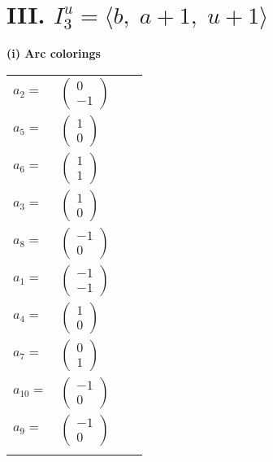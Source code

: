 \documentclass[1p]{elsarticle_modified}
\theoremstyle{definition}
\begin{document}
\centering \section*{III. $I^u_{3}= \langle b,\;a+1,\;u+1 \rangle$}
\flushleft \textbf{(i) Arc colorings}\\
\begin{tabular}{m{7pt} m{180pt} m{7pt} m{180pt} }
\flushright $a_{2}=$&$\begin{pmatrix}0\\-1\end{pmatrix}$ \\
\flushright $a_{5}=$&$\begin{pmatrix}1\\0\end{pmatrix}$ \\
\flushright $a_{6}=$&$\begin{pmatrix}1\\1\end{pmatrix}$ \\
\flushright $a_{3}=$&$\begin{pmatrix}1\\0\end{pmatrix}$ \\
\flushright $a_{8}=$&$\begin{pmatrix}-1\\0\end{pmatrix}$ \\
\flushright $a_{1}=$&$\begin{pmatrix}-1\\-1\end{pmatrix}$ \\
\flushright $a_{4}=$&$\begin{pmatrix}1\\0\end{pmatrix}$ \\
\flushright $a_{7}=$&$\begin{pmatrix}0\\1\end{pmatrix}$ \\
\flushright $a_{10}=$&$\begin{pmatrix}-1\\0\end{pmatrix}$ \\
\flushright $a_{9}=$&$\begin{pmatrix}-1\\0\end{pmatrix}$\\&\end{tabular}
\end{document}
